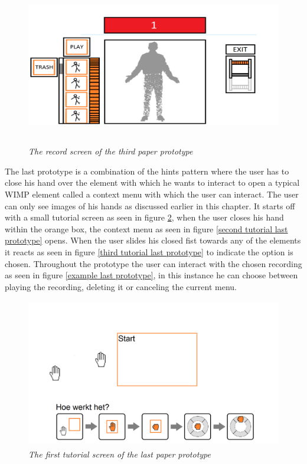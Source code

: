 \begin{figure}[H]
	\begin{center}
		\includegraphics[width=12.5cm, height=7cm]{figures/prototype_6_3_record.png}
		\caption{\emph{The record screen of the third paper prototype}}
		\label{record third prototype}
	\end{center}
\end{figure}

The last prototype is a combination of the hints pattern where the user has to close his hand over the element with which he wants to interact to open a typical WIMP element called a context menu with which the user can interact. The user can only see images of his hands as discussed earlier in this chapter. It starts off with a small tutorial screen as seen in figure \ref{first tutorial last prototype}, when the user closes his hand within the orange box, the context menu as seen in figure \ref{second tutorial last prototype} opens. When the user slides his closed fist towards any of the elements it reacts as seen in figure \ref{third tutorial last prototype} to indicate the option is chosen. Throughout the prototype the user can interact with the chosen recording as seen in figure \ref{example last prototype}, in this instance he can choose between playing the recording, deleting it or canceling the current menu.\\

\begin{figure}[H]
	\begin{center}
		\includegraphics[width=12cm, height=6.5cm]{figures/prototype_7_6_tutorial_1.png}
		\caption{\emph{The first tutorial screen of the last paper prototype}}
		\label{first tutorial last prototype}
	\end{center}
\end{figure}

